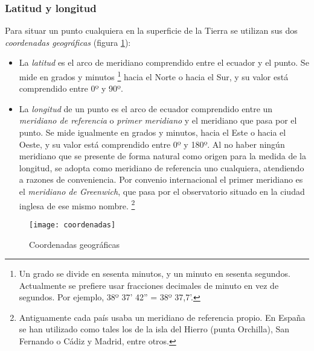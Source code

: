 \subsubsection{Latitud y longitud}

 
 
Para situar un punto cualquiera en la superficie de la Tierra se utilizan sus dos \emph{coordenadas geográficas} (figura \ref{fg:coordenadas}): 
\begin{itemize}
\item La \emph{latitud} es el arco de meridiano comprendido entre el ecuador y el punto. Se mide en grados y minutos%
\footnote{Un grado se divide en sesenta minutos, y un minuto en sesenta segundos. Actualmente se prefiere usar fracciones decimales de minuto en vez de segundos. Por ejemplo, 38º 37’ 42” =  38º 37,7’. }
hacia el Norte o hacia el Sur, y su valor está comprendido entre 0º y 90º. 
\item La \emph{longitud} de un punto es el arco de ecuador comprendido entre un \emph{meridiano de 
referencia} o \emph{primer meridiano} y el meridiano que pasa por el punto. Se mide igualmente en grados y minutos, hacia el Este o hacia el Oeste, y su valor está comprendido entre 0º y 180º. Al no haber ningún meridiano que se presente de forma natural como origen para la medida de la longitud, se adopta como meridiano de referencia uno cualquiera, atendiendo a razones de conveniencia. Por convenio internacional el primer meridiano es el \emph{meridiano de Greenwich}, que pasa por el observatorio situado en la ciudad inglesa de ese mismo nombre.%
\footnote{Antiguamente cada país usaba un meridiano de referencia propio. En España se han utilizado como tales los de  la isla del Hierro (punta Orchilla), San Fernando o Cádiz y Madrid, entre otros.} %
\end{itemize}

\begin{figure}[hbtp]
\begin{center}
\texttt{[image: coordenadas]}\\
\caption{Coordenadas geográficas}
\label{fg:coordenadas}
\end{center}
\end{figure}

